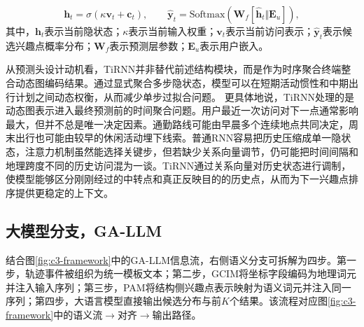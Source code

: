 \begin{equation}
\mathbf{h}_t=\sigma(\kappa\mathbf{v}_t+\mathbf{c}_t),\qquad
\hat{\mathbf{y}}_t=\text{Softmax}(\mathbf{W}_f[\hat{\mathbf{h}}_t\Vert\mathbf{E}_u]),
\label{eq:c3-tirnn}
\end{equation}
其中，$\mathbf{h}_t$表示当前隐状态；$\kappa$表示当前输入权重；$\mathbf{v}_t$表示当前访问表示；$\hat{\mathbf{y}}_t$表示候选兴趣点概率分布；$\mathbf{W}_f$表示预测层参数；$\mathbf{E}_u$表示用户嵌入。

从预测头设计动机看，TiRNN并非替代前述结构模块，而是作为时序聚合终端整合动态图编码结果。通过显式聚合多步隐状态，模型可以在短期活动惯性和中期出行计划之间动态权衡，从而减少单步过拟合问题。
更具体地说，TiRNN处理的是动态图表示进入最终预测前的时间聚合问题。用户最近一次访问对下一点通常影响最大，但并不总是唯一决定因素。通勤路线可能由早晨多个连续地点共同决定，周末出行也可能由较早的休闲活动埋下线索。普通RNN容易把历史压缩成单一隐状态，注意力机制虽然能选择关键步，但若缺少关系向量调节，仍可能把时间间隔和地理跨度不同的历史访问混为一谈。TiRNN通过关系向量对历史状态进行调制，使模型能够区分刚刚经过的中转点和真正反映目的的历史点，从而为下一兴趣点排序提供更稳定的上下文。

\subsection{大模型分支，GA-LLM}
结合图\ref{fig:c3-framework}中的GA-LLM信息流，右侧语义分支可拆解为四步。第一步，轨迹事件被组织为统一模板文本；第二步，GCIM将坐标字段编码为地理词元并注入输入序列；第三步，PAM将结构侧兴趣点表示映射为语义词元并注入同一序列；第四步，大语言模型直接输出候选分布与前$K$个结果。该流程对应图\ref{fig:c3-framework}中的语义流$\rightarrow$对齐$\rightarrow$输出路径。

